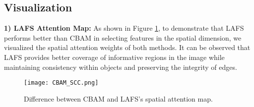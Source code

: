 \documentclass[letterpaper, 10 pt, conference]{ieeeconf}
\begin{document}
\begin{table}[htbp]
\centering
{}
\end{table}

\subsection{Visualization}
\textbf{1) LAFS Attention Map:} As shown in Figure \ref{fig:CBAM}, to demonstrate that LAFS performs better than CBAM \cite{woo2018cbam} in selecting features in the spatial dimension, we visualized the spatial attention weights of both methods. It can be observed that LAFS provides better coverage of informative regions in the image while maintaining consistency within objects and preserving the integrity of edges.

\begin{figure}[htbp]
\vspace {-0.9em}
\centering
\texttt{[image: CBAM\_SCC.png]}
\caption{\label{fig:CBAM}Difference between CBAM and LAFS's spatial attention map.}
\vspace {-0.9em}
\end{figure}
\end{document}
